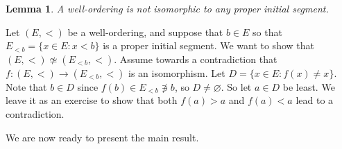 \documentclass[10pt]{article}
\makeatletter
\theoremstyle{newstyle}
\newtheorem{lemma}[thm]{Lemma}
\newenvironment{pf}[1][\proofname]{\par
  \pushQED{\qed}%
  \normalfont \topsep0\p@\relax
  \trivlist
  \item[\hskip\labelsep\scshape
  #1\@addpunct{.}]\ignorespaces
}{%
  \popQED\endtrivlist\@endpefalse
}
\makeatother
\begin{document}
\begin{lemma} 
A well-ordering is not isomorphic to any proper initial segment. 
\end{lemma}
\begin{pf}
Let $(E, <)$ be a well-ordering, and suppose that $b \in E$ so that 
$E_{<b} = \{x \in E : x < b\}$ is a proper initial segment. We want to show that 
$(E, <) \not\simeq (E_{<b}, <)$. Assume towards a contradiction that $f : 
(E, <) \to (E_{<b}, <)$ is an isomorphism. Let $D = \{x \in E: f(x) \neq x\}$. Note that 
$b \in D$ since $f(b) \in E_{<b} \not\ni b$, so $D \neq \varnothing$. So let 
$a \in D$ be least. We leave it as an exercise to show that both $f(a) > a$ and 
$f(a) < a$ lead to a contradiction.
\end{pf}

We are now ready to present the main result. 
\end{document}
